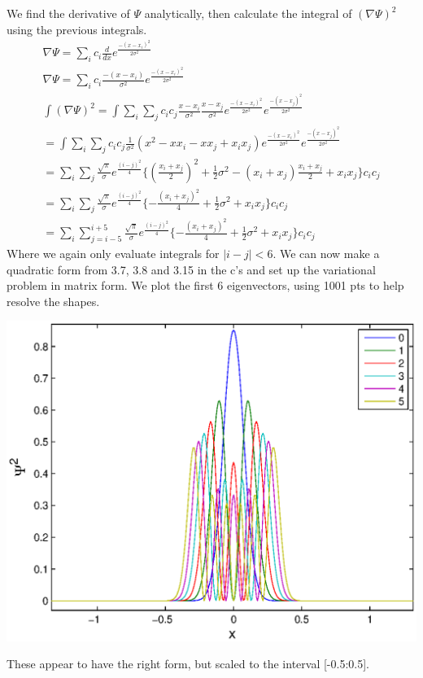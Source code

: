 \documentclass[a4paper,10pt]{article}
\numberwithin{equation}{section}
\begin{document}
We find the derivative of $\Psi$ analytically, then calculate the integral of $(\nabla \Psi)^2$ using the previous integrals.
\begin{gather}
\nabla \Psi= \sum_{i}c_i\frac{d}{dx}e^{\frac{-(x-x_i)^2}{2\sigma ^2}}\\
\nabla \Psi=\sum_{i}c_i\frac{-(x-x_i)}{\sigma ^2}e^{\frac{-(x-x_i)^2}{2\sigma ^2}}\\
\int (\nabla \Psi)^2 = \int \sum_{i}\sum_{j}c_ic_j\frac{x-x_i}{\sigma ^2}\frac{x-x_j}{\sigma ^2}
  e^{\frac{-(x-x_i)^2}{2\sigma ^2}}e^{\frac{-(x-x_j)^2}{2\sigma ^2}}\\
  =\int\sum_{i}\sum_{j}c_ic_j\frac{1}{\sigma ^2}(x^2-xx_i-xx_j+x_ix_j)e^{\frac{-(x-x_i)^2}{2\sigma ^2}}e^{\frac{-(x-x_j)^2}{2\sigma ^2}}\\
  =\sum_{i}\sum_{j}\frac{\sqrt{\pi}}{\sigma}e^{\frac{(i-j)^2}{4}}\{(\frac{x_i+x_j}{2})^2+\frac{1}{2}\sigma ^2
  -(x_i+x_j)\frac{x_i+x_j}{2}
  +x_ix_j\}c_ic_j\\
  =\sum_{i}\sum_{j}\frac{\sqrt{\pi}}{\sigma}e^{\frac{(i-j)^2}{4}}\{-\frac{(x_i+x_j)^2}{4}+\frac{1}{2}\sigma ^2+x_ix_j\}c_ic_j\\
  =\sum_{i}\sum_{j=i-5}^{i+5}\frac{\sqrt{\pi}}{\sigma}e^{\frac{(i-j)^2}{4}}\{-\frac{(x_i+x_j)^2}{4}+\frac{1}{2}\sigma ^2+x_ix_j\}c_ic_j
\end{gather}
Where we again only evaluate integrals for  $|i-j|<6$.
We can now make a quadratic form from 3.7, 3.8 and 3.15 in the c's and set up the variational problem in matrix form.
We plot the first 6 eigenvectors, using 1001 pts to help resolve the shapes.

\includegraphics{variational}

These appear to have the right form, but scaled to the interval [-0.5:0.5]. 
\end{document}
